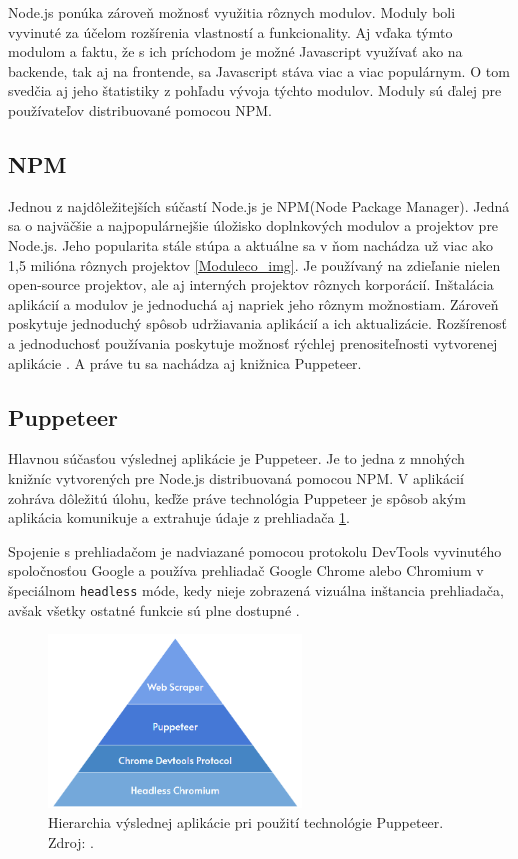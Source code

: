 \bigskip

Node.js ponúka zároveň možnosť využitia rôznych modulov. Moduly boli vyvinuté za účelom rozšírenia vlastností a funkcionality. Aj vďaka týmto modulom a faktu, že s ich príchodom je možné Javascript využívať ako na backende, tak aj na frontende, sa Javascript stáva viac a viac populárnym. O tom svedčia aj jeho štatistiky z pohľadu vývoja týchto modulov. Moduly sú ďalej pre používateľov distribuované pomocou NPM.

\subsection{NPM}

Jednou z najdôležitejších súčastí Node.js je NPM(Node Package Manager). Jedná sa o najväčšie a najpopulárnejšie úložisko doplnkových modulov a projektov pre Node.js. Jeho popularita stále stúpa a aktuálne sa v ňom nachádza už viac ako 1,5 milióna rôznych projektov \ref{Moduleco_img}. Je používaný na zdieľanie nielen open-source projektov, ale aj interných projektov rôznych korporácií. Inštalácia aplikácií a modulov je jednoduchá aj napriek jeho rôznym možnostiam. Zároveň poskytuje jednoduchý spôsob udržiavania aplikácií a ich aktualizácie. Rozšírenosť a jednoduchosť používania poskytuje možnosť rýchlej prenositeľnosti vytvorenej aplikácie \cite{npm}. A práve tu sa nachádza aj knižnica Puppeteer.

\newpage
\subsection{Puppeteer}

Hlavnou súčasťou výslednej aplikácie je Puppeteer. Je to jedna z mnohých knižníc vytvorených pre Node.js distribuovaná pomocou NPM. V aplikácií zohráva dôležitú úlohu, keďže práve technológia Puppeteer je spôsob akým aplikácia komunikuje a extrahuje údaje z prehliadača \ref{pupepyramid_img}. 

Spojenie s prehliadačom je nadviazané pomocou protokolu DevTools vyvinutého spoločnosťou Google a používa prehliadač Google Chrome alebo Chromium v špeciálnom \texttt{headless} móde, kedy nieje zobrazená vizuálna inštancia prehliadača, avšak všetky ostatné funkcie sú plne dostupné \cite{puppeteer}.  

\bigskip

\begin{figure}[hbt]
	\centering
	\includegraphics[width=0.6\textwidth]{obrazky-figures/pyramid.png}
	\caption{Hierarchia výslednej aplikácie pri použití technológie Puppeteer. Zdroj: \cite{pyramid}.}
	\label{pupepyramid_img}
\end{figure}

